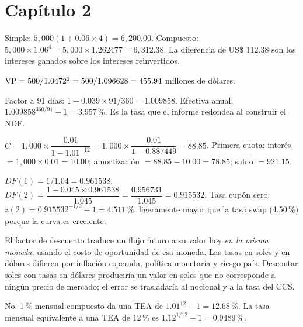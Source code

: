 \section*{Capítulo 2}

 Simple: $5{,}000(1+0.06\times4)=6{,}200.00$. Compuesto: $5{,}000\times1.06^4=5{,}000\times1.262477=6{,}312.38$. La diferencia de US\$ 112.38 son los intereses ganados sobre los intereses reinvertidos.

 $\operatorname{VP}=500/1.0472^2=500/1.096628=455.94$ millones de dólares.

 Factor a 91 días: $1+0.039\times91/360=1.009858$. Efectiva anual: $1.009858^{360/91}-1=3.957\,\%$. Es la tasa que el informe redondea al construir el NDF.

 $C=1{,}000\times\dfrac{0.01}{1-1.01^{-12}}=1{,}000\times\dfrac{0.01}{1-0.887449}=88.85$. Primera cuota: interés $=1{,}000\times0.01=10.00$; amortización $=88.85-10.00=78.85$; saldo $=921.15$.

 $DF(1)=1/1.04=0.961538$. $DF(2)=\dfrac{1-0.045\times0.961538}{1.045}=\dfrac{0.956731}{1.045}=0.915532$. Tasa cupón cero: $z(2)=0.915532^{-1/2}-1=4.511\,\%$, ligeramente mayor que la tasa swap (4.50\,\%) porque la curva es creciente.

 El factor de descuento traduce un flujo futuro a su valor hoy \emph{en la misma moneda}, usando el costo de oportunidad de esa moneda. Las tasas en soles y en dólares difieren por inflación esperada, política monetaria y riesgo país. Descontar soles con tasas en dólares produciría un valor en soles que no corresponde a ningún precio de mercado; el error se trasladaría al nocional y a la tasa del CCS.

 No. 1\,\% mensual compuesto da una TEA de $1.01^{12}-1=12.68\,\%$. La tasa mensual equivalente a una TEA de 12\,\% es $1.12^{1/12}-1=0.9489\,\%$.
